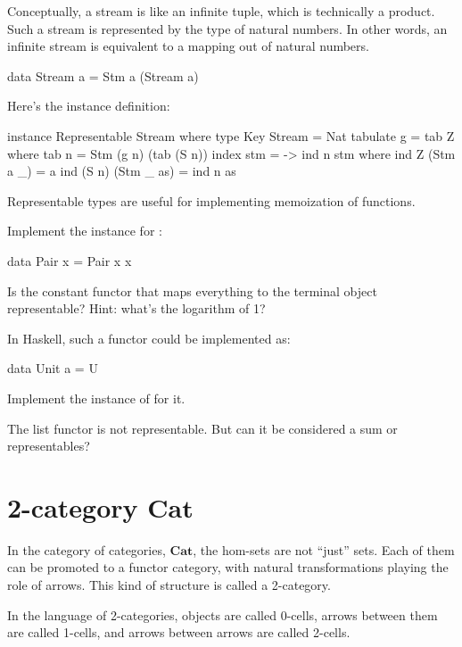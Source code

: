 \documentclass[DaoFP]{subfiles}
\begin{document}
Conceptually, a stream is like an infinite tuple, which is technically a product. Such a stream is represented by the type of natural numbers. In other words, an infinite stream is equivalent to a mapping out of natural numbers. 
\begin{haskell}
data Stream a = Stm a (Stream a)
\end{haskell}
Here's the instance definition:
\begin{haskell}
instance Representable Stream where
  type Key Stream = Nat
  tabulate g = tab Z
    where
      tab n = Stm (g n) (tab (S n))
  index stm = \n -> ind n stm
    where
      ind Z (Stm a _) = a
      ind (S n) (Stm _ as) = ind n as
\end{haskell}
Representable types are useful for implementing  memoization of functions.

\begin{exercise}
Implement the  instance for :
\begin{haskell}
data Pair x = Pair x x
\end{haskell}
\end{exercise}

\begin{exercise}
Is the constant functor that maps everything to the terminal object representable? Hint: what's the logarithm of 1?

In Haskell, such a functor could be implemented as:
\begin{haskell}
data Unit a = U
\end{haskell}
Implement the instance of  for it.
\end{exercise}

\begin{exercise}
The list functor is not representable. But can it be considered a sum or representables?
\end{exercise}

\section{2-category  $\mathbf{Cat}$ }

In the category of categories, $\mathbf{Cat}$, the hom-sets are not ``just'' sets. Each of them can be promoted to a functor category, with natural transformations playing the role of arrows. This kind of structure is called a 2-category. 

In the language of 2-categories, objects are called 0-cells, arrows between them are called 1-cells, and arrows between arrows are called 2-cells. 
\end{document}
